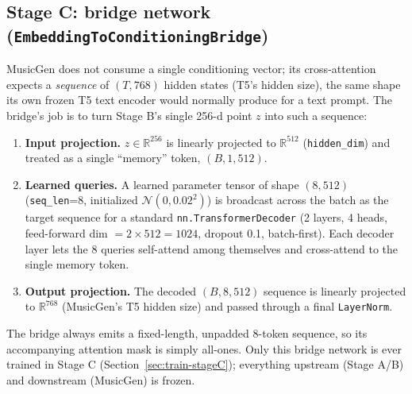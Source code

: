 \documentclass[11pt]{article}
\begin{document}
\subsection{Stage C: bridge network (\texttt{EmbeddingToConditioningBridge})}
\label{sec:bridge-model}
MusicGen does not consume a single conditioning vector; its cross-attention expects a
\emph{sequence} of $(T,768)$ hidden states (T5's hidden size), the same shape its own frozen T5
text encoder would normally produce for a text prompt. The bridge's job is to turn Stage B's single
256-d point $z$ into such a sequence:
\begin{enumerate}
  \item \textbf{Input projection.} $z\in\mathbb{R}^{256}$ is linearly projected to
  $\mathbb{R}^{512}$ (\texttt{hidden\_dim}) and treated as a single ``memory'' token,
  $(B,1,512)$.
  \item \textbf{Learned queries.} A learned parameter tensor of shape $(8,512)$
  (\texttt{seq\_len}=8, initialized $\mathcal{N}(0,0.02^2)$) is broadcast across the batch as the
  target sequence for a standard \texttt{nn.TransformerDecoder} (2 layers, 4 heads,
  feed-forward dim $=2\times512=1024$, dropout 0.1, batch-first). Each decoder layer lets the 8
  queries self-attend among themselves and cross-attend to the single memory token.
  \item \textbf{Output projection.} The decoded $(B,8,512)$ sequence is linearly projected to
  $\mathbb{R}^{768}$ (MusicGen's T5 hidden size) and passed through a final \texttt{LayerNorm}.
\end{enumerate}
The bridge always emits a fixed-length, unpadded 8-token sequence, so its accompanying attention
mask is simply all-ones. Only this bridge network is ever trained in Stage C
(Section~\ref{sec:train-stageC}); everything upstream (Stage A/B) and downstream (MusicGen) is
frozen.
\end{document}
